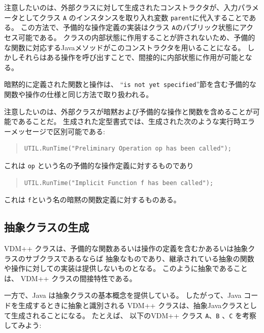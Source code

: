 \documentclass[\pformat,11pt]{jarticle}
\begin{document}
注意したいのは、外部クラスに対して生成されたコンストラクタが、入力パラメータとしてクラス {\tt A} のインスタンスを取り入れ変数 {\tt parent}に代入することである。
この方法で、予備的な操作定義の実装はクラス {\tt A}のパブリック状態にアクセス可能である。
クラスの内部状態に作用することが許されないため、予備的な関数に対応するJavaメソッドがこのコンストラクタを用いることになる。
しかしそれらはある操作を呼び出すことで、間接的に内部状態に作用が可能となる。

暗黙的に定義された関数と操作は、 ``{\tt is not yet specified}''節を含む予備的な関数や操作の仕様と同じ方法で取り扱われる。

注意したいのは、外部クラスが暗黙および予備的な操作と関数を含めることが可能であることだ。
生成された定型書式では、生成された次のような実行時エラーメッセージで区別可能である:

\begin{quote}
\begin{verbatim}
UTIL.RunTime("Preliminary Operation op has been called");
\end{verbatim}
\end{quote}

これは {\tt op} という名の予備的な操作定義に対するものであり

\begin{quote}
\begin{verbatim}
UTIL.RunTime("Implicit Function f has been called");
\end{verbatim}
\end{quote}

これは {\tt f}という名の暗黙の関数定義に対するものある。

\subsection{抽象クラスの生成}

VDM++ クラスは、予備的な関数あるいは操作の定義を含むかあるいは抽象クラスのサブクラスであるならば 抽象なものであり、継承されている抽象の関数や操作に対しての実装は提供しないものとなる。
このように抽象であることは、 VDM++ クラスの間接特性である。

一方で、Java は抽象クラスの基本概念を提供している。
したがって、Java コードを生成するときに抽象と識別される VDM++ クラスは、抽象Javaクラスとして生成されることになる。
たとえば、 以下のVDM++ クラス \texttt{A}、\texttt{B} 、\texttt{C} を考察してみよう:
\end{document}

